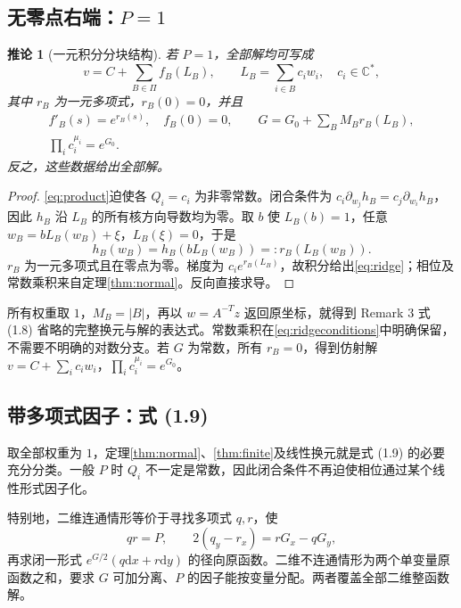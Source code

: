 \documentclass[UTF8,11pt,a4paper,fontset=fandol]{ctexart}
\newtheorem{corollary}[theorem]{推论}
\theoremstyle{definition}\newtheorem{definition}[theorem]{定义}
\theoremstyle{remark}\newtheorem{remark}[theorem]{注}
\newcommand{\C}{\mathbb C}\newcommand{\N}{\mathbb N}
\newcommand{\dd}{\mathrm d}\newcommand{\OO}{\mathcal O}
\begin{document}
\subsection{无零点右端：\texorpdfstring{$P=1$}{P=1}}
\begin{corollary}[一元积分分块结构]\label{cor:ridge}
若 $P=1$，全部解均可写成
\begin{equation}\label{eq:ridge}
v=C+\sum_{B\in\Pi}f_B(L_B),\qquad L_B=\sum_{i\in B}c_iw_i,\quad c_i\in\C^*,
\end{equation}
其中 $r_B$ 为一元多项式，$r_B(0)=0$，并且
\begin{equation}\label{eq:ridgeconditions}
\begin{gathered}
f'_B(s)=e^{r_B(s)},\quad f_B(0)=0,\qquad
G=G_0+\sum_BM_Br_B(L_B),\\
\prod_i c_i^{\mu_i}=e^{G_0}.
\end{gathered}
\end{equation}
反之，这些数据给出全部解。
\end{corollary}
\begin{proof}
\eqref{eq:product}迫使各 $Q_i=c_i$ 为非零常数。闭合条件为 $c_i\partial_{w_j}h_B=c_j\partial_{w_i}h_B$，因此 $h_B$ 沿 $L_B$ 的所有核方向导数均为零。取 $b$ 使 $L_B(b)=1$，任意 $w_B=bL_B(w_B)+\xi$，$L_B(\xi)=0$，于是
\[
h_B(w_B)=h_B(bL_B(w_B))=:r_B(L_B(w_B)).
\]
$r_B$ 为一元多项式且在零点为零。梯度为 $c_i e^{r_B(L_B)}$，故积分给出\eqref{eq:ridge}；相位及常数乘积来自定理\ref{thm:normal}。反向直接求导。
\end{proof}

所有权重取 $1$，$M_B=|B|$，再以 $w=A^{-T}z$ 返回原坐标，就得到 Remark 3 式 (1.8) 省略的完整换元与解的表达式。常数乘积在\eqref{eq:ridgeconditions}中明确保留，不需要不明确的对数分支。若 $G$ 为常数，所有 $r_B=0$，得到仿射解 $v=C+\sum_i c_iw_i$，$\prod_i c_i^{\mu_i}=e^{G_0}$。

\subsection{带多项式因子：式 (1.9)}
取全部权重为 $1$，定理\ref{thm:normal}、\ref{thm:finite}及线性换元就是式 (1.9) 的必要充分分类。一般 $P$ 时 $Q_i$ 不一定是常数，因此闭合条件不再迫使相位通过某个线性形式因子化。

特别地，二维连通情形等价于寻找多项式 $q,r$，使
\begin{equation}\label{eq:2d}
qr=P,\qquad 2(q_y-r_x)=rG_x-qG_y,
\end{equation}
再求闭一形式 $e^{G/2}(q\dd x+r\dd y)$ 的径向原函数。二维不连通情形为两个单变量原函数之和，要求 $G$ 可加分离、$P$ 的因子能按变量分配。两者覆盖全部二维整函数解。
\end{document}
